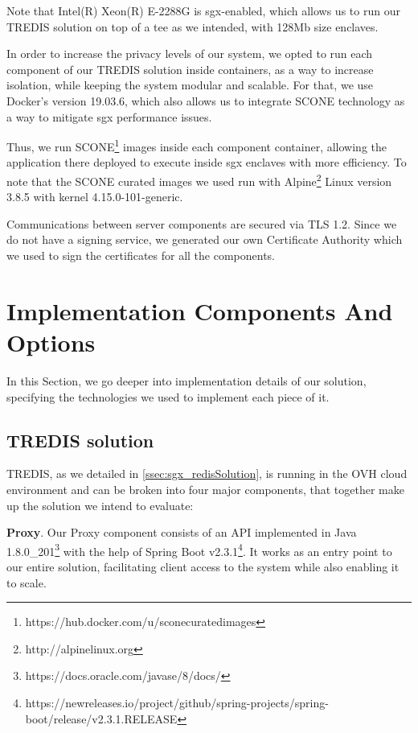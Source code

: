 Note that Intel(R) Xeon(R) E-2288G is \gls{sgx}-enabled, which allows us to run our TREDIS solution on top of a \gls{tee} as we intended, with 128Mb size enclaves. 

In order to increase the privacy levels of our system, we opted to run each component of our TREDIS solution inside containers, as a way to increase isolation, while keeping the system modular and scalable. 
For that, we use Docker's version 19.03.6, which also allows us to integrate SCONE technology as a way to mitigate \gls{sgx} performance issues. 

Thus, we run SCONE\footnote{https://hub.docker.com/u/sconecuratedimages} images  inside each component container, allowing the application there deployed to execute inside \gls{sgx} enclaves with more efficiency. 
To note that the SCONE curated images we used run with Alpine\footnote{http://alpinelinux.org} Linux version 3.8.5 with kernel 4.15.0-101-generic.

Communications between server components are secured via TLS 1.2. Since we do not have a signing service, we generated our own Certificate Authority which we used to sign the certificates for all the components. 



\section{Implementation Components And Options}

In this Section, we go deeper into implementation details of our solution, specifying the technologies we used to implement each piece of it.


\subsection{TREDIS solution}

TREDIS, as we detailed in \ref{ssec:sgx_redisSolution}, is running in the OVH cloud environment and can be broken into four major components, that together make up the solution we intend to evaluate:

\textbf{Proxy}. Our Proxy component consists of an API implemented in Java 1.8.0\_201\footnote{https://docs.oracle.com/javase/8/docs/} with the help of Spring Boot v2.3.1\footnote{https://newreleases.io/project/github/spring-projects/spring-boot/release/v2.3.1.RELEASE}. It works as an entry point to our entire solution, facilitating client access to the system while also enabling it to scale. 

